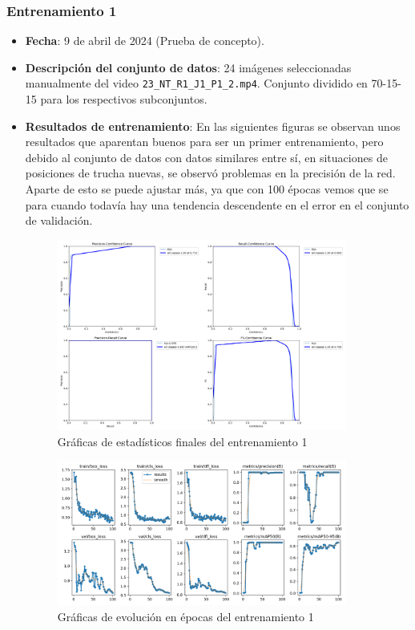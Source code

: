 \subsubsection*{Entrenamiento 1}
\label{train:1}
\begin{itemize}
    \item \textbf{Fecha}: 9 de abril de 2024 (Prueba de concepto).
    \item \textbf{Descripción del conjunto de datos}: 24 imágenes seleccionadas manualmente del video \verb|23_NT_R1_J1_P1_2.mp4|. Conjunto dividido en 70-15-15 para los respectivos subconjuntos.
    \item \textbf{Resultados de entrenamiento}: En las siguientes figuras se observan  unos resultados que aparentan buenos  para ser un primer entrenamiento, pero debido al conjunto de datos con datos similares entre sí, en 
    situaciones de posiciones de trucha nuevas, se observó problemas en la precisión de la red. Aparte de esto se puede ajustar más, ya que con 100 épocas vemos que se para cuando todavía hay una tendencia 
    descendente en el error en el conjunto de validación.
    
    \begin{figure}[H]
        \centering
        \includegraphics[width=0.9\textwidth]{images/13/b/1/PR.png}
        \caption{Gráficas de estadísticos finales del entrenamiento 1}
        \label{fig:Estadisticos1}
    \end{figure}
    \begin{figure}[H]
        \centering
        \includegraphics[width=0.9\textwidth]{images/13/b/1/results.png}
        \caption{Gráficas de evolución en épocas del entrenamiento 1}
        \label{fig:Resultados1}
    \end{figure}
\end{itemize}
